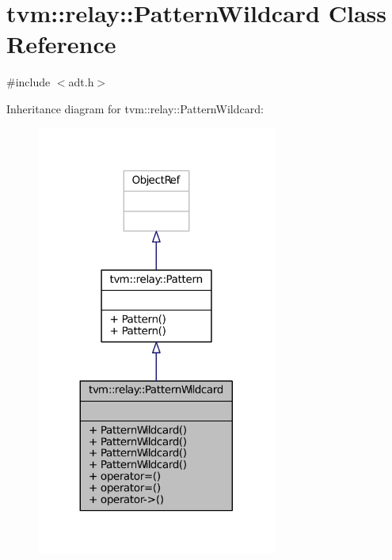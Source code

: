 \hypertarget{classtvm_1_1relay_1_1PatternWildcard}{}\section{tvm\+:\+:relay\+:\+:Pattern\+Wildcard Class Reference}
\label{classtvm_1_1relay_1_1PatternWildcard}


{\ttfamily \#include $<$adt.\+h$>$}



Inheritance diagram for tvm\+:\+:relay\+:\+:Pattern\+Wildcard\+:
\nopagebreak
\begin{figure}[H]
\begin{center}
\leavevmode
\includegraphics[width=224pt]{classtvm_1_1relay_1_1PatternWildcard__inherit__graph}
\end{center}
\end{figure}


